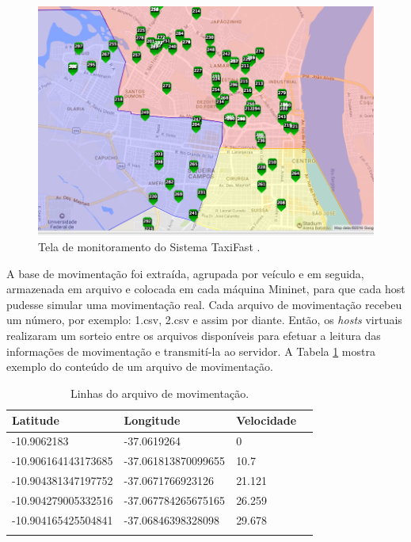 \documentclass[
	12pt,				%
	oneside,			%
	a4paper,			%
	english,			%
	brazil				%
	]{abntex2ppgsi}
\begin{document}
\begin{figure}[h!]
	\centering
	\includegraphics[width=1.0\columnwidth]{images/taxi_mapa.png}
	\caption{Tela de monitoramento do Sistema TaxiFast \cite{taxifast}.}
	\label{fig:monitoramento}
\end{figure}


A base de movimentação foi extraída, agrupada por veículo e em seguida, armazenada em arquivo e colocada em cada máquina Mininet, para que cada host pudesse simular uma  movimentação real. Cada arquivo de movimentação recebeu um número, por exemplo: 1.csv, 2.csv e assim por diante. Então, os \textit{hosts} virtuais realizaram um sorteio entre os arquivos disponíveis para efetuar a leitura das informações de movimentação e transmití-la ao servidor. A Tabela \ref{tab:linhasArquivoMovimentacao} mostra exemplo do conteúdo de um arquivo de movimentação.


\begin{longtable}{ p{}  p{}   p{}  p{}} 
	\hline
	\rowcolor[gray]{0.7}
	Latitude	& Longitude	& Velocidade \\ \hline
	-10.9062183	& -37.0619264& 0 \\ \hline
	-10.906164143173685 & -37.061813870099655 & 10.7	\\ \hline	
	-10.904381347197752 & -37.0671766923126 & 21.121 \\ \hline
	-10.904279005332516  & -37.067784265675165 & 26.259 \\ \hline
	-10.904165425504841 & -37.06846398328098 & 29.678 \\ \hline
	\caption{Linhas do arquivo de movimentação.} 
	\label{tab:linhasArquivoMovimentacao}
\end{longtable}
\end{document}
